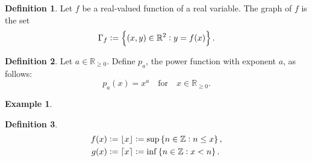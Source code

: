 \documentclass[12pt,openany]{book}
\DeclarePairedDelimiter{\ceil}{\lceil}{\rceil}
\DeclarePairedDelimiter{\floor}{\lfloor}{\rfloor}
\theoremstyle{definition}
\newtheorem{definition}{Definition}[chapter]
\newtheorem{example}{Example}[chapter]
\newcommand{\Z}{\mathbb{Z}}
\newcommand{\R}{\mathbb{R}}
\begin{document}
	\begin{tcolorbox}[colframe=defcolor,title={\color{white}\bf Graph}]
		\begin{definition}
			Let $f$ be a real-valued function of a real variable. The graph of $f$ is the set \[
			\Gamma_f:=\set{(x,y)\in\R^2:y=f(x)}.
			\]
		\end{definition}
	\end{tcolorbox}
	\vspace{8pt}
	\begin{tcolorbox}[colframe=defcolor,title={\color{white}\bf Power Function}]
		\begin{definition}
			Let $a\in\R_{\geq 0}$. Define $p_a$, the power function with exponent $a$, as follows: \[
			p_a(x)=x^a\quad\text{for}\quad x\in\R_{\geq 0}.
			\]
		\end{definition}
	\end{tcolorbox}
	\begin{example}
		\ \begin{center}
		\end{center}
	\end{example}
	\vspace{8pt}
	\begin{tcolorbox}[colframe=defcolor,title={\color{white}\bf The Floor and Ceiling Function}]
		\begin{definition}
			\begin{align*}
				f(x)&:=\floor*{x}:=\sup\set{n\in\Z:n\leq x},\\
				g(x)&:=\ceil*{x}:=\inf\set{n\in\Z:x<n}.
			\end{align*}
		\end{definition}
	\end{tcolorbox}
\end{document}

